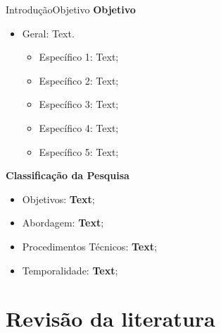 \documentclass[8pt,aspectratio = 1610]{beamer}
\begin{document}
\begin{frame}{Introdução}{Objetivo}
\textbf{Objetivo}


      \begin{itemize}
      \item Geral: Text.
      \begin{itemize}
        \item Específico 1: Text;\\
        \item Específico 2: Text;\\
        \item Específico 3: Text;\\
        \item Específico 4: Text;\\
        \item Específico 5: Text;\\
      \end{itemize}
    \end{itemize}
    
\textbf{Classificação da Pesquisa}
  \begin{itemize}
             \item Objetivos: \textbf{Text};
             \item Abordagem: \textbf{\textbf{Text}};
             \item Procedimentos Técnicos: \textbf{Text};
             \item Temporalidade: \textbf{Text};
  \end{itemize}
  

         
\end{frame}

\section{Revisão da literatura}
\end{document}
